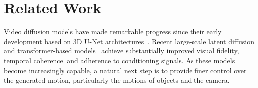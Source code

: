 \ifdefined\arxivbuild\else\documentclass{article}\fi %
\begin{document}



\section{Related Work}
\label{sec:related}

Video diffusion models have made remarkable progress since their early development based on 3D U-Net architectures~\citep{lumiere,svd,videocrafter1,animatediff}. Recent large-scale latent diffusion and transformer-based models~\citep{cogvideo,hunyuanvideo,wanvideo,cogvideox} achieve substantially improved visual fidelity, temporal coherence, and adherence to conditioning signals. As these models become increasingly capable, a natural next step is to provide finer control over the generated motion, particularly the motions of objects and the camera.
\end{document}
